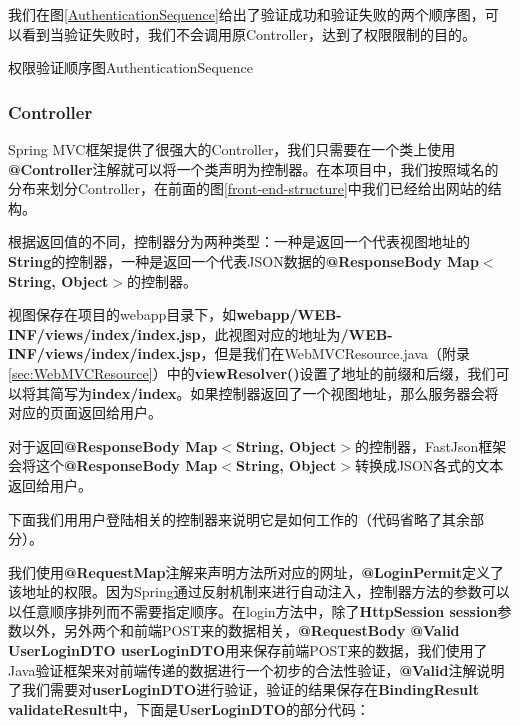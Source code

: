 我们在图\ref{AuthenticationSequence}给出了验证成功和验证失败的两个顺序图，可以看到当验证失败时，我们不会调用原Controller，达到了权限限制的目的。

\begin{pics}[htbp]{权限验证顺序图}{AuthenticationSequence}
\end{pics}

\subsubsection{Controller}
Spring MVC框架提供了很强大的Controller，我们只需要在一个类上使用\textbf{@Controller}注解就可以将一个类声明为控制器。在本项目中，我们按照域名的分布来划分Controller，在前面的图\ref{front-end-structure}中我们已经给出网站的结构。

根据返回值的不同，控制器分为两种类型：一种是返回一个代表视图地址的\textbf{String}的控制器，一种是返回一个代表JSON数据的\textbf{@ResponseBody Map$<$String, Object$>$}的控制器。

视图保存在项目的webapp目录下，如\textbf{webapp/WEB-INF/views/index/index.jsp}，此视图对应的地址为\textbf{/WEB-INF/views/index/index.jsp}，但是我们在WebMVCResource.java（附录\ref{sec:WebMVCResource}）中的\textbf{viewResolver()}设置了地址的前缀和后缀，我们可以将其简写为\textbf{index/index}。如果控制器返回了一个视图地址，那么服务器会将对应的页面返回给用户。

对于返回\textbf{@ResponseBody Map$<$String, Object$>$}的控制器，FastJson框架会将这个\textbf{@ResponseBody Map$<$String, Object$>$}转换成JSON各式的文本返回给用户。

下面我们用用户登陆相关的控制器来说明它是如何工作的（代码省略了其余部分）。



我们使用\textbf{@RequestMap}注解来声明方法所对应的网址，\textbf{@LoginPermit}定义了该地址的权限。因为Spring通过反射机制来进行自动注入，控制器方法的参数可以以任意顺序排列而不需要指定顺序。在login方法中，除了\textbf{HttpSession session}参数以外，另外两个和前端POST来的数据相关，\textbf{@RequestBody @Valid UserLoginDTO userLoginDTO}用来保存前端POST来的数据，我们使用了Java验证框架来对前端传递的数据进行一个初步的合法性验证，\textbf{@Valid}注解说明了我们需要对\textbf{userLoginDTO}进行验证，验证的结果保存在\textbf{BindingResult validateResult}中，下面是\textbf{UserLoginDTO}的部分代码：




